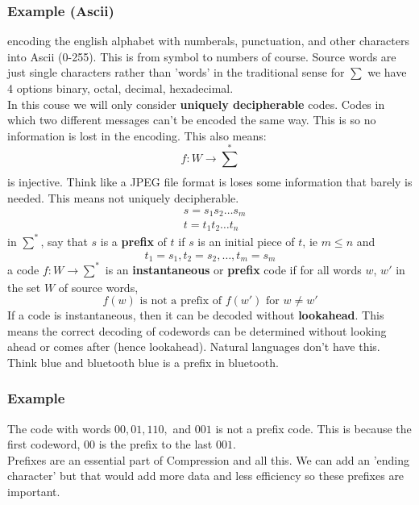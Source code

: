 \documentclass{article}
\begin{document}
\subsubsection*{Example (Ascii)}
encoding the english alphabet with numberals, punctuation, and other characters into Ascii (0-255). This is from symbol to numbers of course. Source words are just single characters rather than 'words' in the traditional sense
for $\sum$ we have 4 options binary, octal, decimal, hexadecimal.
\vspace{6mm}
\\
In this couse we will only consider \textbf{uniquely decipherable} codes. Codes in which two different messages can't be encoded the same way. This is so no information is lost in the encoding.
This also means:
\[f: W \rightarrow \sum_{}^{*}\]
is injective. Think like a JPEG file format is loses some information that barely is needed. This means not uniquely decipherable.
\begin{align*}
    &s=s_1s_2 \dots s_m\\
    &t=t_1t_2 \dots t_n
\end{align*}
in $\sum_{}^{*}$, say that $s$ is a \textbf{prefix} of $t$ if $s$ is an initial piece of $t$, ie $m \leq n$ and 
\[t_1=s_1, t_2=s_2, \dots, t_m = s_m\]
a code $f:W \rightarrow \sum_{}^{*}$ is an \textbf{instantaneous} or \textbf{prefix} code if for all words $w$, $w'$ in the set $W$ of source words,
\[f(w) \text{ is not a prefix of } f(w') \text{ for } w \neq w'\]
If a code is instantaneous, then it can be decoded without \textbf{lookahead}. This means the correct decoding of codewords can be determined without looking ahead or comes after (hence lookahead). Natural languages don't have this.
Think blue and bluetooth blue is a prefix in bluetooth.
\subsubsection*{Example}
The code with words $00, 01, 110,$ and $001$ is not a prefix code. This is because the first codeword, $00$ is the prefix to the last $001$.
\vspace{6mm}
\\
Prefixes are an essential part of Compression and all this. We can add an 'ending character' but that would add more data and less efficiency so these prefixes are important. 
\end{document}
